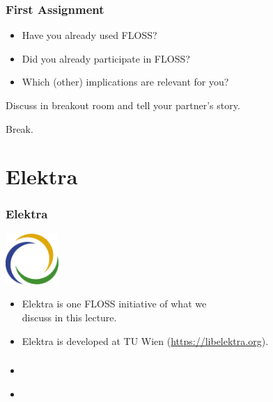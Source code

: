 \begin{assignment}
	\frametitle{First Assignment}
	\begin{itemize}
		\item Have you already used FLOSS?
		\item Did you already participate in FLOSS?
		\item Which (other) implications are relevant for you?
	\end{itemize}
	\begin{task}
	Discuss in breakout room and tell your partner's story.
	\end{task}
\end{assignment}

\begin{assignment}
	\begin{task}
	Break.
	\end{task}
\end{assignment}

\section{Elektra}

\begin{frame}
	\frametitle{Elektra}
	\hfill \includegraphics[width=2cm]{../figures/logo}
	\vspace{-1cm}
	\begin{itemize}
		\item Elektra is one FLOSS initiative of what we \\ discuss in this lecture.
		\item Elektra is developed at TU Wien (\url{https://libelektra.org}).
	\end{itemize}
\end{frame}

{
\shadowoffset{0.5pt}
%
\begin{frame}
	\frametitle{}
	\begin{itemize}[<+->]
		\item   \textcolor{white}{}\\
			\textcolor{white}{}
		\item   \textcolor{white}{}
	\end{itemize}
\end{frame}
}

